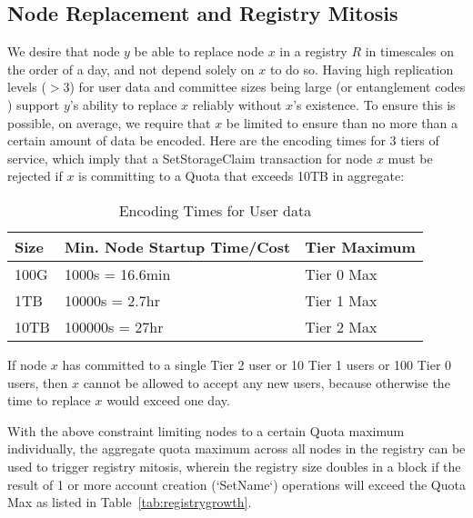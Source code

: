 \documentclass[journal]{IEEEtran}
\newcommand{\tx}[1]{\textsf{#1}}
\begin{document}
\subsection{Node Replacement and Registry Mitosis}
\label{sec:nodedynamics}

We desire that node $y$ be able to replace node $x$ in a registry $R$ in timescales on the order of a day, and not depend solely on $x$ to do so.
Having high replication levels ($> 3$) for user data and committee sizes being large (or entanglement codes \cite{DBLP:journals/corr/abs-1810-02974}) support $y$'s ability to replace $x$ reliably without $x$'s existence.
To ensure this is possible, on average, we require that $x$ be limited to ensure than no more than a certain amount of data be encoded.
Here are the encoding times for 3 tiers of service, which imply that a \tx{SetStorageClaim} transaction for node $x$ must be rejected if $x$ is committing to a Quota that exceeds 10TB in aggregate:

\begin{table}[]
    \centering
\begin{tabular}{l|l|l} \hline
 Size   & Min.  Node Startup Time/Cost & Tier Maximum \\ \hline
  100G  & 1000s	= 16.6min  & Tier 0 Max \\
  1TB   & 10000s = 2.7hr   & Tier 1 Max \\
  10TB  & 100000s	= 27hr & Tier 2 Max \\ \hline
\end{tabular}
    \caption{Encoding Times for User data}
    \label{tab:my_label}
\end{table}

If node $x$ has committed to a single Tier 2 user or 10 Tier 1 users or 100 Tier 0 users, then $x$ cannot be allowed to accept any new users, because otherwise the time to replace $x$ would exceed one day.

With the above constraint limiting nodes to a certain Quota maximum individually, the aggregate quota maximum across all nodes in the registry can be used to trigger registry mitosis, wherein the registry size doubles in a block if the result of 1 or more account creation (`SetName`) operations will exceed the Quota Max as listed in Table~\ref{tab:registrygrowth}.
\end{document}
